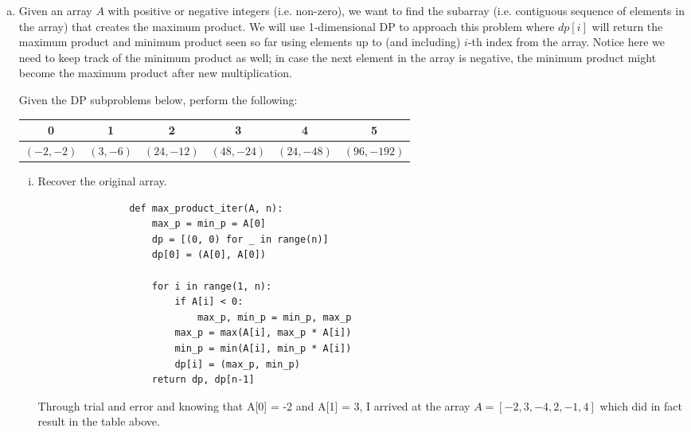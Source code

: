 \documentclass[11pt]{article}
\begin{document}

\begin{enumerate}[(a)]
    \item Given an array $A$ with positive or negative integers (i.e. non-zero), we want to find the subarray (i.e. contiguous sequence of elements in the array) that creates the maximum product. We will use 1-dimensional DP to approach this problem where $dp[i]$ will return the maximum product and minimum product seen so far using elements up to (and including) $i$-th index from the array. Notice here we need to keep track of the minimum product as well; in case the next element in the array is negative, the minimum product might become the maximum product after new multiplication. 

    Given the DP subproblems below, perform the following:
    \begin{center}
    \begin{tabular}{ |c|c|c|c|c|c| } 
    \hline
    0 & 1 & 2 & 3 & 4 & 5\\ 
    \hline
    $(-2, -2)$ & $(3, -6)$ & $(24, -12)$ & $(48, -24)$ & $(24, -48)$ & $(96, -192)$\\
    \hline
    \end{tabular}
    \end{center}
    \begin{enumerate}[(i)]
        \item Recover the original array.\\
        \begin{solution}
            \begin{verbatim}
                def max_product_iter(A, n):
                    max_p = min_p = A[0]
                    dp = [(0, 0) for _ in range(n)]
                    dp[0] = (A[0], A[0])
                
                    for i in range(1, n):
                        if A[i] < 0:
                            max_p, min_p = min_p, max_p
                        max_p = max(A[i], max_p * A[i]) 
                        min_p = min(A[i], min_p * A[i]) 
                        dp[i] = (max_p, min_p)
                    return dp, dp[n-1]
                \end{verbatim}
            Through trial and error and knowing that A[0] = -2 and A[1] = 3, I arrived at the array
            $A = [-2, 3, -4, 2, -1, 4]$ which did in fact result in the table above.
        \end{solution}
    

\end{enumerate}
\end{enumerate}
\end{document}
